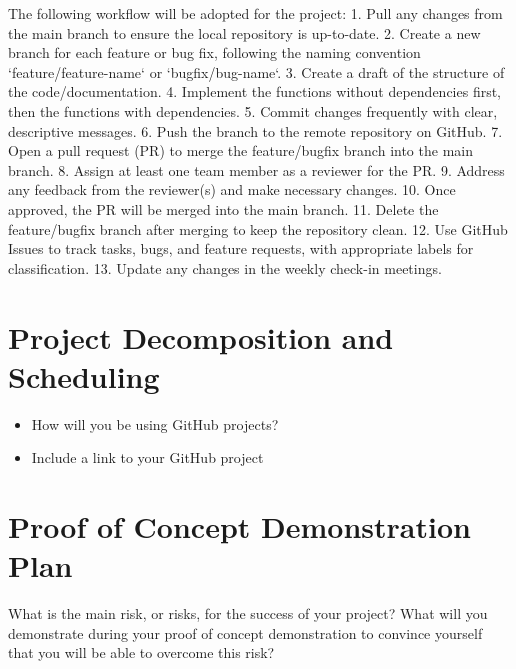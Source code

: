 \documentclass{article}
\begin{document}
The following workflow will be adopted for the project:
1. Pull any changes from the main branch to ensure the local repository is up-to-date.
2. Create a new branch for each feature or bug fix, following the naming convention `feature/feature-name` or `bugfix/bug-name`.
3. Create a draft of the structure of the code/documentation. 
4. Implement the functions without dependencies first, then the functions with dependencies.
5. Commit changes frequently with clear, descriptive messages.
6. Push the branch to the remote repository on GitHub.
7. Open a pull request (PR) to merge the feature/bugfix branch into the main branch.
8. Assign at least one team member as a reviewer for the PR.
9. Address any feedback from the reviewer(s) and make necessary changes.
10. Once approved, the PR will be merged into the main branch.
11. Delete the feature/bugfix branch after merging to keep the repository clean.
12. Use GitHub Issues to track tasks, bugs, and feature requests, with appropriate labels for classification.
13. Update any changes in the weekly check-in meetings.


\section{Project Decomposition and Scheduling}

\begin{itemize}
  \item How will you be using GitHub projects?
  \item Include a link to your GitHub project
\end{itemize}


\section{Proof of Concept Demonstration Plan}

What is the main risk, or risks, for the success of your project?  What will you
demonstrate during your proof of concept demonstration to convince yourself that
you will be able to overcome this risk?
\end{document}
